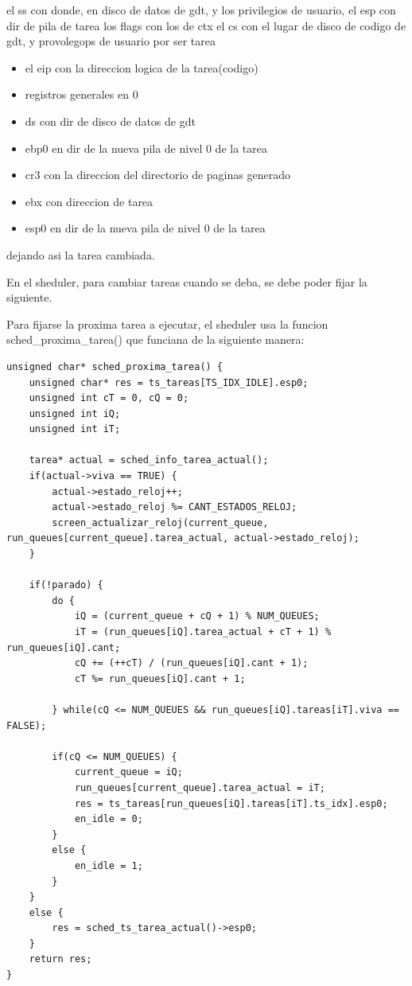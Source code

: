 \documentclass[a4paper]{article}
\newenvironment{codesnippet}{%
	\begin{Sbox}\begin{minipage}{\textwidth}\sffamily\small}%
	{\end{minipage}\end{Sbox}%
		\begin{center}%
		\vspace{-0.4cm}\colorbox{litegrey}{\TheSbox}\end{center}\vspace{0.3cm}}
\begin{document}
el ss con donde, en disco de datos de gdt, y los privilegios de usuario, 
el esp con dir de pila de tarea
los flags con los de ctx
el cs con el lugar de disco de codigo de gdt, y provolegops de usuario por ser tarea
\begin{itemize}


\item el eip con la direccion logica de la tarea(codigo)
\item registros generales en 0
\item ds con dir de disco de datos de gdt
\item ebp0  en dir de la nueva pila de nivel 0 de la tarea
\item cr3 con la direccion del directorio de paginas generado
\item ebx con direccion de tarea
\item esp0  en dir de la nueva pila de nivel 0 de la tarea

\end{itemize}

dejando asi la tarea cambiada.


En el sheduler, para cambiar tareas cuando se deba, se debe poder fijar la siguiente.

Para fijarse la proxima tarea a ejecutar, el sheduler usa la funcion sched_proxima_tarea() que funciana de la siguiente  manera:


\begin{codesnippet}
\begin{verbatim}		
unsigned char* sched_proxima_tarea() {
    unsigned char* res = ts_tareas[TS_IDX_IDLE].esp0;
    unsigned int cT = 0, cQ = 0;
    unsigned int iQ;
    unsigned int iT;

    tarea* actual = sched_info_tarea_actual();
    if(actual->viva == TRUE) {
        actual->estado_reloj++;
        actual->estado_reloj %= CANT_ESTADOS_RELOJ;
        screen_actualizar_reloj(current_queue, run_queues[current_queue].tarea_actual, actual->estado_reloj);
    }

    if(!parado) {
        do {
            iQ = (current_queue + cQ + 1) % NUM_QUEUES;
            iT = (run_queues[iQ].tarea_actual + cT + 1) % run_queues[iQ].cant;
            cQ += (++cT) / (run_queues[iQ].cant + 1);
            cT %= run_queues[iQ].cant + 1;

        } while(cQ <= NUM_QUEUES && run_queues[iQ].tareas[iT].viva == FALSE);

        if(cQ <= NUM_QUEUES) {
            current_queue = iQ;
            run_queues[current_queue].tarea_actual = iT;
            res = ts_tareas[run_queues[iQ].tareas[iT].ts_idx].esp0;
            en_idle = 0;
        }
        else {
            en_idle = 1;
        }
    }
    else {
        res = sched_ts_tarea_actual()->esp0;
    }
    return res;
} 
\end{verbatim}
\end{codesnippet}
\end{document}
